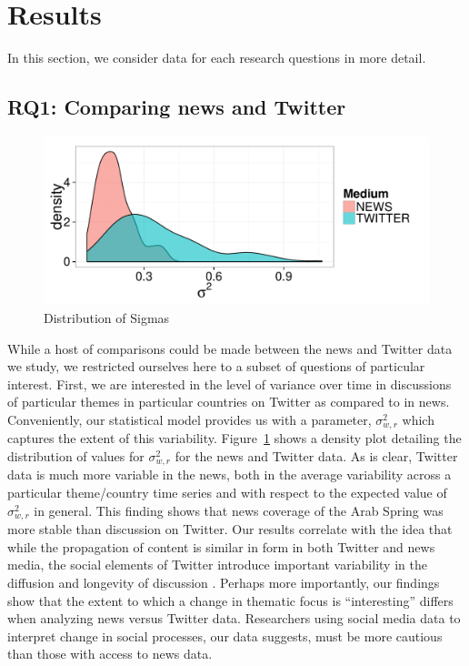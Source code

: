 \section{Results}

In this section, we consider data for each research questions in more detail.

\subsection{{\bf RQ1}: Comparing news and Twitter } 
\begin{figure}[t]
	\centering
	\includegraphics[width=.5\textwidth]{imgs/diff_sigma}
	\caption{Distribution of Sigmas}
	\label{fig:sig}
\end{figure}

While a host of comparisons could be made between the news and Twitter data we study, we restricted ourselves here to a subset of questions of particular interest. First, we are interested in the level of variance over time in discussions of particular themes in particular countries on Twitter as compared to in news.  Conveniently, our statistical model provides us with a parameter, $\sigma^2_{w,r}$ which captures the extent of this variability. Figure~\ref{fig:sig} shows a density plot detailing the distribution of values for $\sigma^2_{w,r}$ for the news and Twitter data.  As is clear, Twitter data is much more variable in the news, both in the average variability across a particular theme/country time series and with respect to the expected value of $\sigma^2_{w,r}$ in general.  This finding shows that news coverage of the Arab Spring was more stable than discussion on Twitter.  Our results correlate with the idea that while the propagation of content is similar in form in both Twitter and news media,  the social elements of Twitter introduce important variability in the diffusion and longevity of discussion \citep{yang_patterns_2011}.  Perhaps more importantly, our findings show that the extent to which a change in thematic focus is ``interesting'' differs when analyzing news versus Twitter data. Researchers using social media data to interpret change in social processes, our data suggests, must be more cautious than those with access to news data.

